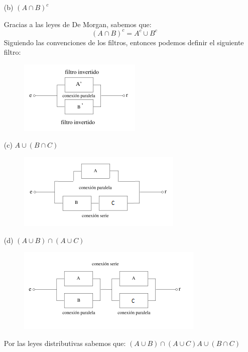 \documentclass[10pt]{article}
\begin{document}
\begin{ej}
\begin{itemize}
\begin{itemize}
		\item[(b)] 	$(A \cap B)^c$
		
				Gracias a las leyes de De Morgan, sabemos que:
				$$(A \cap B)^c = A^c \cup B^c$$ 
				Siguiendo las convenciones de los filtros, entonces podemos definir el siguiente filtro:
				\begin{figure}[H]
					\centering
		 			\includegraphics[scale=0.7]{figuras/conjuntos/ejercicio15/img3.png}
				\end{figure}
				
		\item[(c)] 	$A \cup (B \cap C)$
				\begin{figure}[H]
					\centering
		 			\includegraphics[scale=0.7]{figuras/conjuntos/ejercicio15/img4.png}
				\end{figure}		
		
		\item[(d)] 	$(A \cup B) \cap  (A \cup C)$
				\begin{figure}[H]
					\centering
		 			\includegraphics[scale=0.7]{figuras/conjuntos/ejercicio15/img5.png}
				\end{figure}
				Por las leyes distributivas sabemos que: $(A \cup B) \cap  (A \cup C) A \cup (B \cap C) $
				

\end{itemize}
\end{itemize}
\end{ej}
\end{document}
